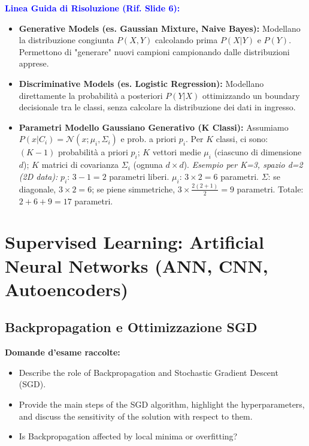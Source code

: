 \documentclass[11pt,a4paper]{article}
\begin{document}
\textbf{\textcolor{blue}{Linea Guida di Risoluzione (Rif. Slide 6):}}
\begin{itemize}
    \item \textbf{Generative Models (es. Gaussian Mixture, Naive Bayes):} Modellano la distribuzione congiunta $P(X, Y)$ calcolando prima $P(X|Y)$ e $P(Y)$. Permettono di "generare" nuovi campioni campionando dalle distribuzioni apprese.
    \item \textbf{Discriminative Models (es. Logistic Regression):} Modellano direttamente la probabilità a posteriori $P(Y|X)$ ottimizzando un boundary decisionale tra le classi, senza calcolare la distribuzione dei dati in ingresso.
    \item \textbf{Parametri Modello Gaussiano Generativo (K Classi):} Assumiamo $P(x|C_i) = \mathcal{N}(x; \mu_i, \Sigma_i)$ e prob. a priori $p_i$.
    Per $K$ classi, ci sono: $(K-1)$ probabilità a priori $p_i$; $K$ vettori medie $\mu_i$ (ciascuno di dimensione $d$); $K$ matrici di covarianza $\Sigma_i$ (ognuna $d \times d$). 
    \textit{Esempio per K=3, spazio d=2 (2D data):} 
    $p_i$: $3-1 = 2$ parametri liberi. $\mu_i$: $3 \times 2 = 6$ parametri. $\Sigma$: se diagonale, $3 \times 2 = 6$; se piene simmetriche, $3 \times \frac{2(2+1)}{2} = 9$ parametri. Totale: $2+6+9 = 17$ parametri.
\end{itemize}


\section{Supervised Learning: Artificial Neural Networks (ANN, CNN, Autoencoders)}

\subsection{Backpropagation e Ottimizzazione SGD}
\textbf{Domande d'esame raccolte:}
\begin{itemize}
    \item Describe the role of Backpropagation and Stochastic Gradient Descent (SGD).
    \item Provide the main steps of the SGD algorithm, highlight the hyperparameters, and discuss the sensitivity of the solution with respect to them.
    \item Is Backpropagation affected by local minima or overfitting?
\end{itemize}
\end{document}
